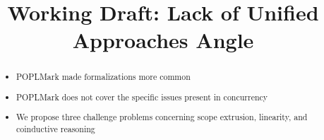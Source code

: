 \documentclass{article}
\begin{document}
\title{Working Draft: Lack of Unified Approaches Angle}

\maketitle

\begin{abstract}
  \noindent
  \begin{itemize}
  \item POPLMark made formalizations more common
  \item POPLMark does not cover the specific issues present in concurrency
  \item We propose three challenge problems concerning scope extrusion, linearity, and coinductive reasoning
  \end{itemize}
\end{abstract}
\end{document}

